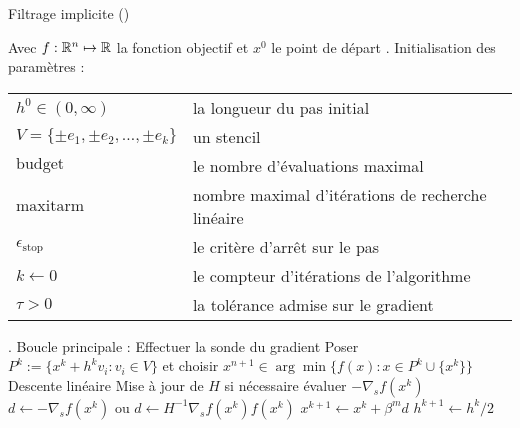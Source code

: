 \begin{algorithm}[H]
	\caption{\textsf{Filtrage implicite} (\imfil)}
	\label{alg:imf}
	\begin{algorithmic}
		\STATE Avec $f:\mathbb{R}^n \mapsto \mathbb{R}$ la fonction objectif et $x^0$ le point de départ
		. \textsf{Initialisation des paramètres} :
		\bindent 
		\STATE\begin{flushleft}
			\begin{tabular}{l l}
				$h^0 \in (0,\infty)$ & la longueur du pas initial\\
				$V = \{\pm e_1,\pm e_2,\dots,\pm e_k\}$ & un stencil\\
				$\text{budget}$ & le nombre d'évaluations maximal\\
				$\text{maxitarm}$ & nombre maximal d'itérations de recherche linéaire\\
				$\epsilon_{\text{stop}} $ & le critère d'arrêt sur le pas\\
				$k \leftarrow 0$ & le compteur d'itérations de l'algorithme\\
				$\tau > 0$ & la tolérance admise sur le gradient\\
			\end{tabular}
		\end{flushleft}
		\eindent
		. \textsf{Boucle principale} :
		\bindent 
			\STATE Effectuer la sonde du gradient
			\STATE Poser $P^k := \{x^k+h^kv_i: v_i \in V\}$ et choisir $x^{n+1}\in \arg\min\{f(x):x\in P^k \cup \{x^k\}\}$
			\STATE \textsf{Descente linéaire}
			\STATE Mise à jour de $H$ si nécessaire
			\STATE évaluer $-\nabla_{s}f(x^k)$
				\STATE $d \leftarrow -\nabla_{s}f(x^k)$ ou $d \leftarrow H^{-1}\nabla_{s}f(x^k)f(x^k)$
					\STATE $x^{k+1} \leftarrow x^k + \beta^m d$
				\ENDIF
			\ELSE
			\STATE $h^{k+1} \leftarrow {h^k}/{2}$
			\ENDIF
		\ENDWHILE
		\eindent
	\end{algorithmic}
\end{algorithm}
